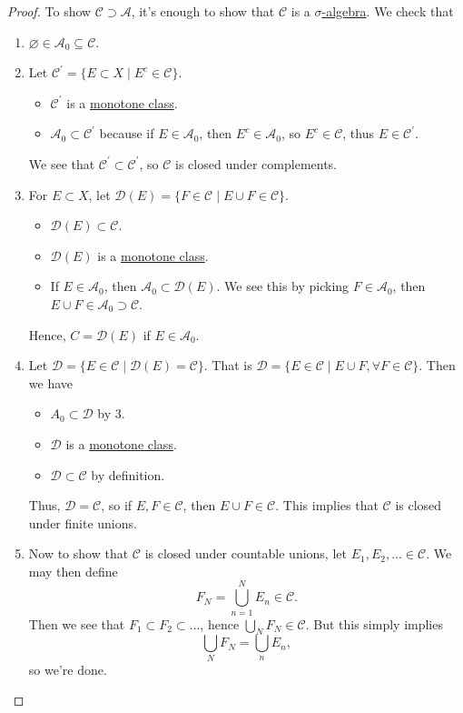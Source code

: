 \begin{proof}
	To show \(\mathcal{C} \supset \mathcal{A} \), it's enough to show that \(\mathcal{C} \) is a \hyperref[def:sigma-algebra]{\(\sigma\)-algebra}. We check that
	\begin{enumerate}
		\item \(\varnothing \in \mathcal{A} _0 \subseteq \mathcal{C} \).
		\item Let \(\mathcal{C} ^\prime = \{E\subset X \mid E^{c} \in \mathcal{C} \}\).
		      \begin{itemize}
			      \item \(\mathcal{C} ^\prime \) is a \hyperref[def:monotone-class]{monotone class}.
			      \item \(\mathcal{A} _0\subset \mathcal{C} ^\prime \) because if \(E\in \mathcal{A} _0\), then \(E^{c} \in \mathcal{A} _0\), so
			            \(E^{c} \in \mathcal{C} \), thus \(E\in \mathcal{C} ^\prime \).
		      \end{itemize}
		      We see that \(\mathcal{C} ^\prime \subset \mathcal{C}^\prime \), so \(\mathcal{C} \) is closed under complements.
		\item For \(E\subset X\), let \(\mathcal{D} (E) = \{F\in \mathcal{C} \mid E \cup F\in \mathcal{C} \}\).
		      \begin{itemize}
			      \item \(\mathcal{D} (E)\subset \mathcal{C} \).
			      \item \(\mathcal{D} (E)\) is a \hyperref[def:monotone-class]{monotone class}.
			      \item If \(E\in \mathcal{A} _0\), then \(\mathcal{A} _0\subset \mathcal{D} (E)\). We see this by picking \(F\in \mathcal{A} _0\), then
			            \(E\cup F\in \mathcal{A} _0\supset \mathcal{C} \).
		      \end{itemize}
		      Hence, \(C = \mathcal{D} (E)\) if \(E\in \mathcal{A} _0\).
		\item Let \(\mathcal{D} = \{E\in \mathcal{C} \mid \mathcal{D} (E) = \mathcal{C} \}\). That is \(\mathcal{D}  = \{E\in \mathcal{C} \mid E\cup F, \forall F\in \mathcal{C} \}\).
		      Then we have
		      \begin{itemize}
			      \item \(A_0\subset \mathcal{D} \) by 3.
			      \item \(\mathcal{D} \) is a \hyperref[def:monotone-class]{monotone class}.
			      \item \(\mathcal{D} \subset \mathcal{C} \) by definition.
		      \end{itemize}
		      Thus, \(\mathcal{D}  = \mathcal{C} \), so if \(E, F\in \mathcal{C} \), then \(E\cup F\in \mathcal{C} \). This implies that \(\mathcal{C} \) is closed under finite unions.
		\item Now to show that \(\mathcal{C}\) is closed under countable unions, let \(E_1, E_2, \dots \in \mathcal{C}  \). We may then define
		      \[
			      F_{N} = \bigcup_{n=1}^{N} E_{n} \in \mathcal{C} .
		      \]
		      Then we see that \(F_1\subset F_2\subset \dots  \), hence \(\bigcup_{N} F_{N} \in \mathcal{C}\). But this simply implies
		      \[
			      \bigcup_{N}F_{N} = \bigcup_{n}E_{n} ,
		      \]
		      so we're done.
	\end{enumerate}
\end{proof}